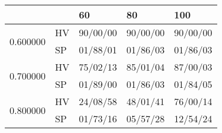 \begin{tabular}{lllll}
\toprule
 &  & 60 & 80 & 100 \\
\midrule
\multirow[t]{2}{*}{0.600000} & HV & 90/00/00 & 90/00/00 & 90/00/00 \\
 & SP & 01/88/01 & 01/86/03 & 01/86/03 \\
\cline{1-5}
\multirow[t]{2}{*}{0.700000} & HV & 75/02/13 & 85/01/04 & 87/00/03 \\
 & SP & 01/89/00 & 01/86/03 & 01/84/05 \\
\cline{1-5}
\multirow[t]{2}{*}{0.800000} & HV & 24/08/58 & 48/01/41 & 76/00/14 \\
 & SP & 01/73/16 & 05/57/28 & 12/54/24 \\
\cline{1-5}
\bottomrule
\end{tabular}
